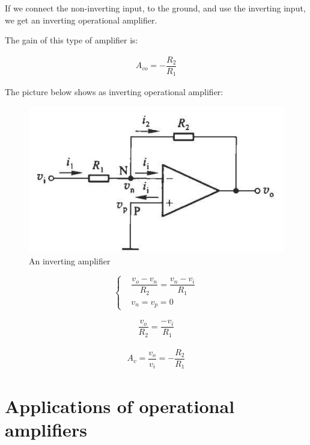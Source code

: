 If we connect the non-inverting input, to the ground, and use the inverting input, we get an inverting operational amplifier.

The gain of this type of amplifier is:

\begin{equation*}
  \begin{aligned}
    A_{vo} = - \dfrac{R_2}{R_1} 
  \end{aligned}
\end{equation*}

The picture below shows as inverting operational amplifier:

\begin{figure}[H]
  \centering
  \includegraphics[width=0.4\linewidth]{figures/inverting-amplifier}
  \caption{An inverting amplifier}
  \label{fig:}
\end{figure}

\begin{equation*}
  \left\{
  \begin{aligned}
    & \dfrac{v_o - v_n}{R_2} = \dfrac{v_n - v_i}{R_1} \\
    & v_n = v_p = 0
  \end{aligned}
  \right.
\end{equation*}

\begin{equation*}
  \begin{aligned}
    \dfrac{v_o}{R_2} = \dfrac{- v_i}{R_1}  
  \end{aligned}
\end{equation*}



\begin{equation*}
  \begin{aligned}
    A_v = \dfrac{v_o}{v_i} = - \dfrac{R_2}{R_1}  
  \end{aligned}
\end{equation*}

\section{Applications of operational amplifiers}

